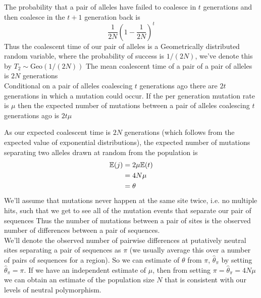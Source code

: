 
The probability that a pair of alleles
have failed to coalesce in $t$ generations and then coalesce in the
$t+1$ generation back is
\begin{equation}
  \frac{1}{2N} \left(1- \frac{1}{2N} \right)^{t} \label{eqn:coal_time_dist}
\end{equation}
Thus the coalescent time of our pair of alleles is a Geometrically distributed random variable,
where the probability of success is $1/(2N)$, we've denote this by $T_2 \sim  \text{Geo}(1/(2N))$
The mean coalescent time of a pair of a pair of alleles is $2N$ generations\\

Conditional on a pair of alleles coalescing $t$ generations ago
there are $2t$ generations in which a mutation could occur. If the per
generation mutation rate is $\mu$ then the expected number of
mutations between a pair of alleles coalescing $t$ generations ago is
$2 t\mu$

As our expected coalescent time is $2N$ generations (which follows from the expected value of exponential distributions), the expected
number of mutations separating two alleles drawn at random from the
population is
%
\begin{align}
  \mathbb{E}(j) &= 2\mu\mathbb{E}(t) \\ \nonumber
  &= 4N\mu \\
  &= \theta \nonumber
\end{align}
We'll assume that mutations never happen at the same site twice,
i.e. no multiple hits, such that we get to see all of the mutation events that separate our pair
of sequences  Thus the number of
mutations between a pair of sites is the observed number of
differences between a pair of sequences. \\

We'll denote the observed number of pairwise differences at putatively neutral
sites separating a pair of sequences as $\pi$ (we usually average this over a
number of pairs of sequences for a region). So we can estimate of $\theta$ from
$\pi$, $\widehat{\theta}_{\pi}$ by setting $\widehat{\theta}_{\pi}=\pi$.  If we
have an independent estimate of $\mu$, then from setting $\pi =
\widehat{\theta}_{\pi} = 4N\mu$ we can obtain an estimate of the population
size $N$ that is consistent with our levels of neutral polymorphism.

